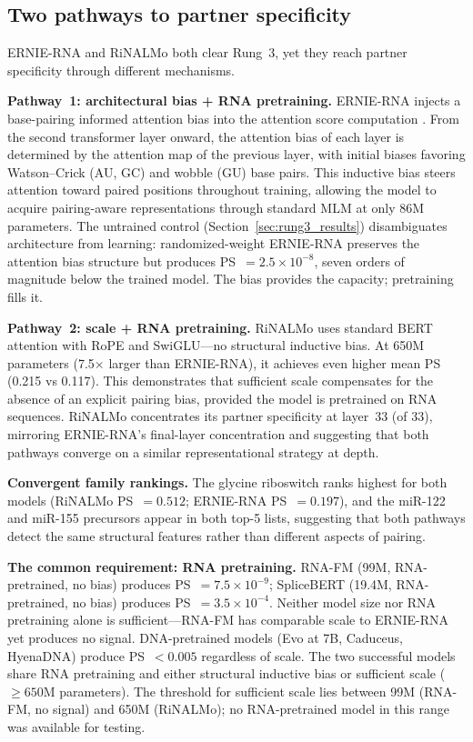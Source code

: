 \documentclass[11pt]{article}
\begin{document}
\subsection{Two pathways to partner specificity}
\label{sec:two_pathways}

ERNIE-RNA and RiNALMo both clear Rung~3, yet they reach partner
specificity through different mechanisms.

\textbf{Pathway~1: architectural bias + RNA pretraining.}
ERNIE-RNA injects a base-pairing informed attention bias into the
attention score computation \citep{yin2024ernierna}.  From the second
transformer layer onward, the attention bias of each layer is
determined by the attention map of the previous layer, with initial
biases favoring Watson--Crick (AU, GC) and wobble (GU) base pairs.
This inductive bias steers attention toward paired positions
throughout training, allowing the model to acquire pairing-aware
representations through standard MLM at only 86M parameters.
The untrained control (Section~\ref{sec:rung3_results}) disambiguates
architecture from learning: randomized-weight ERNIE-RNA preserves
the attention bias structure but produces PS~$= 2.5 \times 10^{-8}$,
seven orders of magnitude below the trained model.  The bias provides
the capacity; pretraining fills it.

\textbf{Pathway~2: scale + RNA pretraining.}
RiNALMo uses standard BERT attention with RoPE and SwiGLU---no
structural inductive bias.  At 650M parameters (7.5$\times$ larger
than ERNIE-RNA), it achieves even higher mean PS (0.215 vs 0.117).
This demonstrates that sufficient scale compensates for the absence
of an explicit pairing bias, provided the model is pretrained on RNA
sequences.  RiNALMo concentrates its partner specificity at layer~33
(of 33), mirroring ERNIE-RNA's final-layer concentration and
suggesting that both pathways converge on a similar representational
strategy at depth.

\textbf{Convergent family rankings.}
The glycine riboswitch ranks highest for both models (RiNALMo
PS~$= 0.512$; ERNIE-RNA PS~$= 0.197$), and the miR-122 and miR-155
precursors appear in both top-5 lists, suggesting that both pathways
detect the same structural features rather than different aspects of
pairing.

\textbf{The common requirement: RNA pretraining.}
RNA-FM (99M, RNA-pretrained, no bias) produces PS~$= 7.5 \times
10^{-9}$; SpliceBERT (19.4M, RNA-pretrained, no bias) produces
PS~$= 3.5 \times 10^{-4}$.  Neither model size nor RNA pretraining
alone is sufficient---RNA-FM has comparable scale to ERNIE-RNA yet
produces no signal.  DNA-pretrained models (Evo at 7B, Caduceus,
HyenaDNA) produce PS~$< 0.005$ regardless of scale.  The two
successful models share RNA pretraining and either structural
inductive bias or sufficient scale ($\geq 650$M parameters).  The
threshold for sufficient scale lies between 99M (RNA-FM, no signal)
and 650M (RiNALMo); no RNA-pretrained model in this range was
available for testing.
\end{document}
